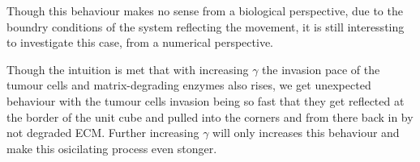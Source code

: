 Though this behaviour makes no sense from a biological perspective, due to the boundry conditions of the system reflecting the movement, it is still interessting to investigate this case, from a numerical perspective.\newline

Though the intuition is met that with increasing $\gamma$ the invasion pace of the tumour cells and matrix-degrading enzymes also rises, we get unexpected behaviour with the tumour cells invasion being so fast that they get reflected at the border of the unit cube and pulled into the corners and from there back in by not degraded ECM. Further increasing $\gamma$ will only increases this behaviour and make this osicilating process even stonger.


